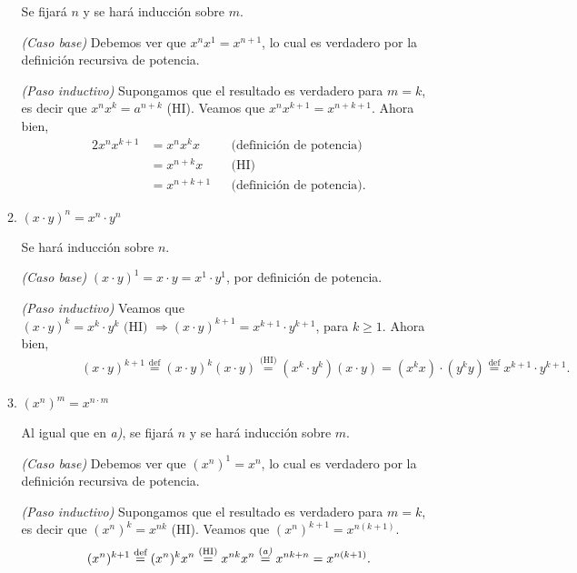 \begin{enumerate}
\begin{enumerate}
            \rta Se fijará $n$ y se hará inducción sobre $m$. 
            
            \textit{(Caso base)} Debemos ver que $x^{n}x^1 = x^{n+1}$, lo cual es verdadero por la definición recursiva de potencia. 
            
            \noindent \textit{(Paso  inductivo)} Supongamos que el resultado es verdadero para $m=k$, es decir que $x^{n}x^k = a^{n+k}$ (HI). Veamos que  $x^{n}x^{k+1} = x^{n+k+1}$. Ahora bien, 
            \begin{alignat*}2
            x^{n}x^{k+1} &= x^{n}x^{k}x&  & \text{(definición de potencia)} \\
            &= x^{n+k}x& & \text{(HI)} \\
            &= x^{n+k+1}&  & \text{(definición de potencia)}. 
            \end{alignat*}
            \item $(x\cdot y)^n=x^n\cdot y^n$
            
            \rta Se  hará inducción sobre $n$.
            
            \textit{(Caso base)} $(x\cdot y)^1=x\cdot y = x^1\cdot y^1$, por definición de potencia. 
            
            \textit{(Paso  inductivo)} Veamos que  $(x\cdot y)^k=x^k\cdot y^k \text{ (HI) } \Rightarrow (x\cdot y)^{k+1}=x^{k+1}\cdot y^{k+1}$, para $k \ge 1$. Ahora bien,
            \begin{multline*}
            \qquad\; \qquad (x\cdot y)^{k+1} \overset{\text{def}}{=} (x\cdot y)^{k} (x\cdot y) \overset{\text{(HI)}}{=} (x^{k}\cdot y^{k}) (x\cdot y) = (x^{k}x)\cdot (y^{k}y) \overset{\text{def}}{=}  x^{k+1}\cdot y^{k+1}.
            \end{multline*}
            
             
             
            
            \item $(x^n)^m = x^{n\cdot m}$
            
            \rta Al igual que en \textit{a)}, se fijará $n$ y se hará inducción sobre $m$.
            
            \textit{(Caso base)} Debemos ver que $(x^n)^1 = x^n$, lo cual es verdadero por la definición recursiva de potencia. 
            
            \textit{(Paso  inductivo)} Supongamos que el resultado es verdadero para $m=k$, es decir que  $(x^n)^k = x^{nk}$ (HI). Veamos que  $(x^n)^{k+1} = x^{n(k+1)}$. 
            \begin{equation*}
            (x^n)^{k+1}  \overset{\text{def}}{=} (x^n)^{k}x^n
            \overset{\text{(HI)}}{=} x^{nk}x^n
            \overset{\text{(\textit{a)}}}{=} x^{nk+n} 
            = x^{n(k+1)}.  
            \end{equation*} 
        \end{enumerate}


\end{enumerate}

